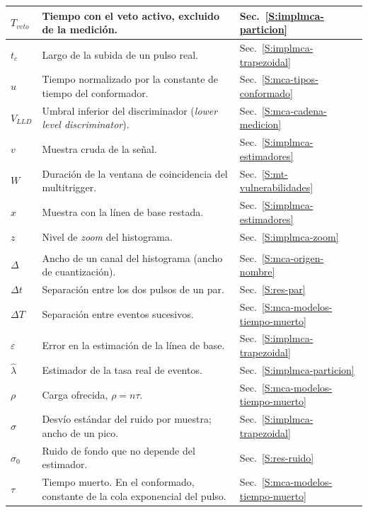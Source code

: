 {\begin{longtable}{|>{\centering\arraybackslash}p{}%
  |>{\raggedright\arraybackslash}p{}%
  |>{\raggedright\arraybackslash}p{}|}
$T_{veto}$ & Tiempo con el veto activo, excluido de la medición. & Sec.~\ref{S:implmca-particion} \\ \hline
$t_c$ & Largo de la subida de un pulso real. & Sec.~\ref{S:implmca-trapezoidal} \\ \hline
$u$ & Tiempo normalizado por la constante de tiempo del conformador. & Sec.~\ref{S:mca-tipos-conformado} \\ \hline
$V_{LLD}$ & Umbral inferior del discriminador (\emph{lower level discriminator}). & Sec.~\ref{S:mca-cadena-medicion} \\ \hline
$v$ & Muestra cruda de la señal. & Sec.~\ref{S:implmca-estimadores} \\ \hline
$W$ & Duración de la ventana de coincidencia del multitrigger. & Sec.~\ref{S:mt-vulnerabilidades} \\ \hline
$x$ & Muestra con la línea de base restada. & Sec.~\ref{S:implmca-estimadores} \\ \hline
$z$ & Nivel de \emph{zoom} del histograma. & Sec.~\ref{S:implmca-zoom} \\ \hline
\multicolumn{3}{|l|}{\textbf{Letras griegas}} \\ \hline
$\Delta$ & Ancho de un canal del histograma (ancho de cuantización). & Sec.~\ref{S:mca-origen-nombre} \\ \hline
$\Delta t$ & Separación entre los dos pulsos de un par. & Sec.~\ref{S:res-par} \\ \hline
$\Delta T$ & Separación entre eventos sucesivos. & Sec.~\ref{S:mca-modelos-tiempo-muerto} \\ \hline
$\varepsilon$ & Error en la estimación de la línea de base. & Sec.~\ref{S:implmca-trapezoidal} \\ \hline
$\hat\lambda$ & Estimador de la tasa real de eventos. & Sec.~\ref{S:implmca-particion} \\ \hline
$\rho$ & Carga ofrecida, $\rho = n\tau$. & Sec.~\ref{S:mca-modelos-tiempo-muerto} \\ \hline
$\sigma$ & Desvío estándar del ruido por muestra; ancho de un pico. & Sec.~\ref{S:implmca-trapezoidal} \\ \hline
$\sigma_0$ & Ruido de fondo que no depende del estimador. & Sec.~\ref{S:res-ruido} \\ \hline
$\tau$ & Tiempo muerto. En el conformado, constante de la cola exponencial del pulso. & Sec.~\ref{S:mca-modelos-tiempo-muerto} \\ \hline
\end{longtable}
}
